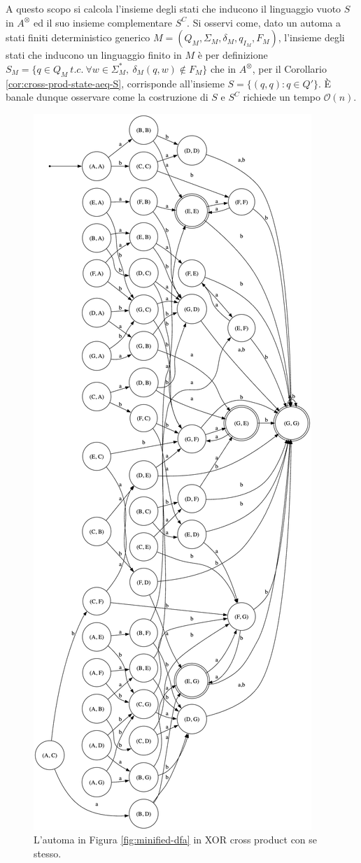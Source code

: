 \documentclass[a4paper,12pt,twoside,openright]{report}
\newcommand{\bigo}[0]{\mathcal{O}}            %
\begin{document}
A questo scopo si calcola l'insieme degli stati che inducono il linguaggio vuoto $S$ in $A^\otimes$ ed il suo 
insieme complementare $S^C$. Si osservi come, dato un automa a stati finiti deterministico generico 
$M = (Q_M, \Sigma_M, \delta_M, q_{I_M}, F_M)$, l'insieme degli stati che inducono un linguaggio finito in $M$
è per definizione $S_M = \{q \in Q_M \ t.c. \ \forall w \in \Sigma^*_M, \ \delta_M(q, w) \notin F_M\}$ che in
$A^\otimes$, per il Corollario \ref{cor:cross-prod-state-aeq-S}, corrisponde all'insieme $S = \{ (q, q) : q \in Q' \}$. 
È banale dunque osservare come la costruzione di $S$ e $S^C$ richiede un tempo $\bigo(n)$.

\begin{figure}
  \centering
  \includegraphics[width=0.5\linewidth]{images/dfa_xcp.png}
  \caption{\label{fig:dfa-xcp}L'automa in Figura \ref{fig:minified-dfa} in XOR cross product con se stesso.}
\end{figure}
\end{document}
